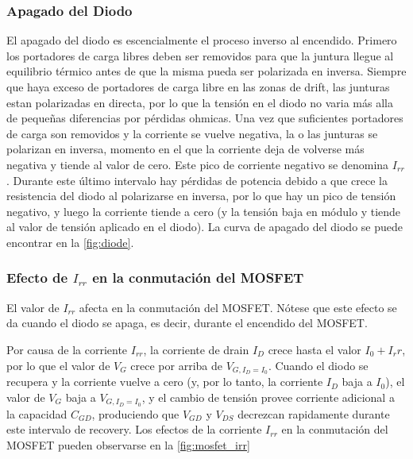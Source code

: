 \documentclass[e4_tp1_main.tex]{subfiles}
\begin{document}
\subsubsection{Apagado del Diodo}
El apagado del diodo es escencialmente el proceso inverso al encendido. Primero los portadores de carga libres deben ser removidos para que la juntura llegue al equilibrio térmico antes de que la misma pueda ser polarizada en inversa. Siempre que haya exceso de portadores de carga libre en las zonas de drift, las junturas estan polarizadas en directa, por lo que la tensión en el diodo no varia más alla de pequeñas diferencias por pérdidas ohmicas. Una vez que suficientes portadores de carga son removidos y la corriente se vuelve negativa, la o las junturas se polarizan en inversa, momento en el que la corriente deja de volverse más negativa y tiende al valor de cero. Este pico de corriente negativo se denomina $I_{rr}$. Durante este último intervalo hay pérdidas de potencia debido a que crece la resistencia del diodo al polarizarse en inversa, por lo que hay un pico de tensión negativo, y luego la corriente tiende a cero (y la tensión baja en módulo y tiende al valor de tensión aplicado en el diodo). La curva de apagado del diodo se puede encontrar en la \autoref{fig:diode}.

\subsubsection{Efecto de $I_{rr}$ en la conmutación del MOSFET}

El valor de $I_{rr}$ afecta en la conmutación del MOSFET. Nótese que este efecto se da cuando el diodo se apaga, es decir, durante el encendido del MOSFET.

Por causa de la corriente $I_{rr}$, la corriente de drain $I_D$ crece hasta el valor $I_0+I_rr$, por lo que el valor de $V_{G}$ crece por arriba de $V_{G,I_D=I_0}$. Cuando el diodo se recupera y la corriente vuelve a cero (y, por lo tanto, la corriente $I_D$ baja a $I_0$), el valor de $V_G$ baja a $V_{G,I_D=I_0}$, y el cambio de tensión provee corriente adicional a la capacidad $C_{GD}$, produciendo que $V_{GD}$ y $V_{DS}$ decrezcan rapidamente durante este intervalo de recovery. Los efectos de la corriente $I_{rr}$ en la conmutación del MOSFET pueden observarse en la \autoref{fig:mosfet_irr}
\end{document}
